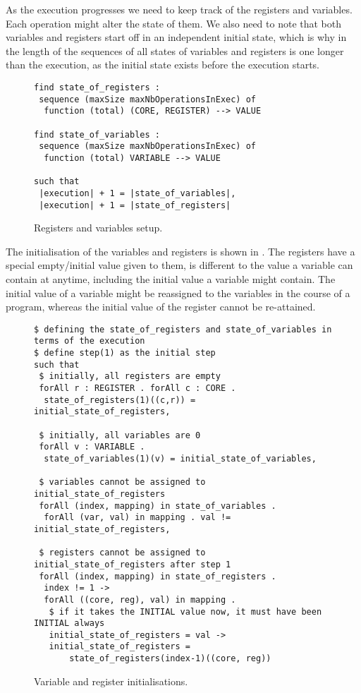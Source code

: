 \documentclass[runningheads]{llncs}
\begin{document}
As the execution progresses we need to keep track of the registers and variables.
Each operation might alter the state of them.
We also need to note that both variables and registers start off in an independent initial state, which is why in  the length of the sequences of all states of variables and registers is one longer than the execution, as the initial state exists before the execution starts.

\begin{figure}
\begin{lstlisting}
find state_of_registers :
 sequence (maxSize maxNbOperationsInExec) of
  function (total) (CORE, REGISTER) --> VALUE

find state_of_variables :
 sequence (maxSize maxNbOperationsInExec) of
  function (total) VARIABLE --> VALUE

such that
 |execution| + 1 = |state_of_variables|,
 |execution| + 1 = |state_of_registers|
\end{lstlisting}
\caption{Registers and variables setup. \label{fig:essence4}}
\end{figure}


The initialisation of the variables and registers is shown in .
The registers have a special empty/initial value given to them, is different to the value a variable can contain at anytime, including the initial value a variable might contain.
The initial value of a variable might be reassigned to the variables in the course of a program, whereas the initial value of the register cannot be re-attained.

\begin{figure}[t]
\begin{lstlisting}
$ defining the state_of_registers and state_of_variables in terms of the execution
$ define step(1) as the initial step
such that
 $ initially, all registers are empty
 forAll r : REGISTER . forAll c : CORE .
  state_of_registers(1)((c,r)) = initial_state_of_registers,

 $ initially, all variables are 0
 forAll v : VARIABLE .
  state_of_variables(1)(v) = initial_state_of_variables,

 $ variables cannot be assigned to initial_state_of_registers
 forAll (index, mapping) in state_of_variables .
  forAll (var, val) in mapping . val != initial_state_of_registers,

 $ registers cannot be assigned to initial_state_of_registers after step 1
 forAll (index, mapping) in state_of_registers .
  index != 1 ->
  forAll ((core, reg), val) in mapping .
   $ if it takes the INITIAL value now, it must have been INITIAL always
   initial_state_of_registers = val ->
   initial_state_of_registers =
       state_of_registers(index-1)((core, reg))
\end{lstlisting}
\caption{Variable and register initialisations.\label{fig:essence-step1}}
\end{figure}
\end{document}
